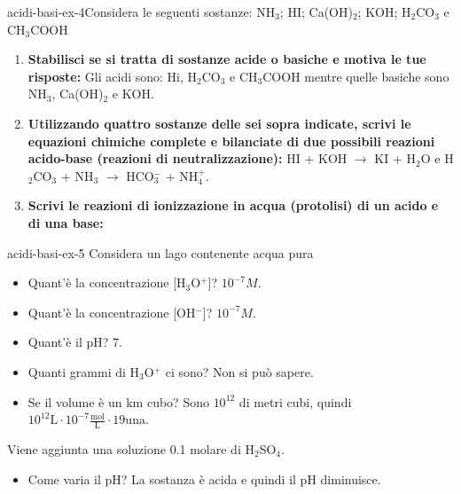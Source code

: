 \documentclass[preview]{standalone}
\begin{document}
\begin{snippetexercise}{acidi-basi-ex-4}{Considera le seguenti sostanze:
    NH\(_3\); HI; Ca(OH)\({}_2\); KOH; H\({}_2\)CO\({}_3\) e CH\({}_3\)COOH}
    \begin{enumerate}
        \item \textbf{Stabilisci se si tratta di sostanze acide o basiche e motiva le tue risposte:}
            Gli acidi sono: Hi, H\({}_2\)CO\({}_3\) e CH\({}_3\)COOH
            mentre quelle basiche sono NH\(_3\), Ca(OH)\({}_2\) e KOH.
        \item \textbf{Utilizzando quattro sostanze delle sei sopra indicate, scrivi le equazioni chimiche
        complete e bilanciate di due possibili reazioni acido-base (reazioni di
        neutralizzazione):}
        HI + KOH \(\rightarrow\) KI + H\({}_2\)O
        e
        H\({}_2\)CO\({}_3\) + NH\({}_3\) \(\rightarrow\) HCO\({}_3^-\) + NH\({}_4^+\).
        \item \textbf{Scrivi le reazioni di ionizzazione in acqua (protolisi) di un acido e di una base:}

    \end{enumerate}
\end{snippetexercise}

\begin{snippetexercise}{acidi-basi-ex-5}{}
    Considera un lago contenente acqua pura
    \begin{itemize}
        \item Quant'è la concentrazione [H\({}_3\)O\({}^+\)]?
            \(10^{-7} M\).
        \item Quant'è la concentrazione [OH\({}^-\)]?
            \(10^{-7} M\).
        \item Quant'è il pH? 7.
        \item Quanti grammi di H\({}_3\)O\({}^+\) ci sono?
            Non si può sapere.
        \item Se il volume è un km cubo?
            Sono \(10^{12}\) di metri cubi, quindi
            \(10^{12} \text{L} \cdot 10^{-7} \frac{\text{mol}}{\text{L}} \cdot 19 \text{una}\).
    \end{itemize}
    Viene aggiunta una soluzione 0.1 molare di H\({}_2\)SO\({}_4\).
    \begin{itemize}
        \item Come varia il pH? La sostanza è acida e quindi il pH diminuisce.
    \end{itemize}
\end{snippetexercise}
\end{document}

